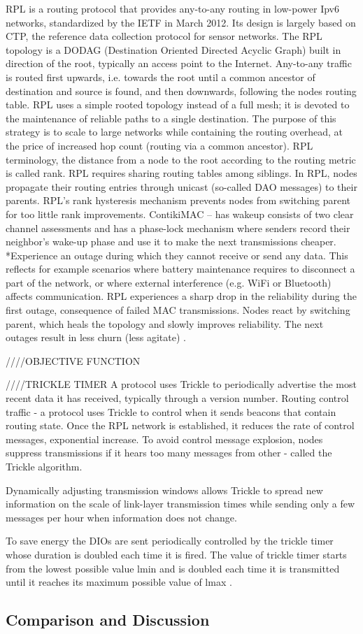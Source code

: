 RPL is a routing protocol that provides any-to-any routing in low-power Ipv6 networks, standardized by the IETF in March 2012. Its design is largely based on CTP, the reference data collection protocol for sensor networks. The RPL topology is a DODAG (Destination Oriented Directed Acyclic Graph) built in direction of the root, typically an access point to the Internet. Any-to-any traffic is routed first upwards, i.e. towards the root until a common ancestor of destination and source is found, and then downwards, following the nodes routing table. RPL uses a simple rooted topology instead of a full mesh; it is devoted to the maintenance of reliable paths to a single destination. The purpose of this strategy is to scale to large networks while containing the routing overhead, at the price of increased hop count (routing via a common ancestor). RPL terminology, the distance from a node to the root according to the routing metric is called rank. RPL requires sharing routing tables among siblings. In RPL, nodes propagate their routing entries through unicast (so-called DAO messages) to their parents. RPL’s rank hysteresis mechanism prevents nodes from switching parent for too little rank improvements. ContikiMAC – has wakeup consists of two clear channel assessments and has a phase-lock mechanism where senders record their neighbor’s wake-up phase and use it to make the next transmissions cheaper. *Experience an outage during which they cannot receive or send any data. This reflects for example scenarios where battery maintenance requires to disconnect a part of the network, or where external interference (e.g. WiFi or Bluetooth) affects communication. RPL experiences a sharp drop in the reliability during the first outage, consequence of failed MAC transmissions. Nodes react by switching parent, which heals the topology and slowly improves reliability. The next outages result in less churn (less agitate) \cite{orpl}.

////OBJECTIVE FUNCTION

////TRICKLE TIMER
A protocol uses Trickle to periodically advertise the most recent data it has received, typically through a version number. Routing control traffic - a protocol uses Trickle to control when it sends beacons that contain routing state.
Once the RPL network is established, it reduces the rate of control messages, exponential increase. To avoid control message explosion, nodes suppress transmissions if it hears too many messages from other - called the Trickle algorithm. 

Dynamically adjusting transmission windows allows Trickle to spread new information on the scale of link-layer transmission times while sending only a few messages per hour when information does not change.

To save energy the DIOs are sent periodically controlled by the trickle timer whose duration is doubled each time it is fired. The value of trickle timer starts from the lowest possible value lmin and is doubled each time it is transmitted until it reaches its maximum possible value of lmax \cite{trickle}.

\subsection{Comparison and Discussion}
